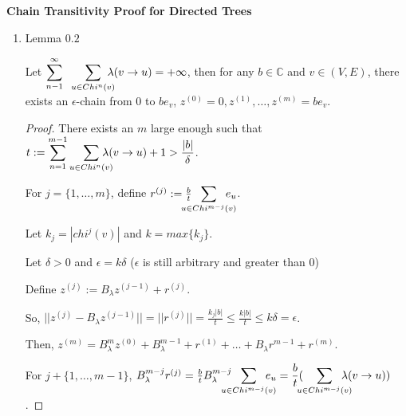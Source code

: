 \documentclass{article}
\begin{document}
\begin{center}
{\bf 
Chain Transitivity Proof for Directed Trees\\

}
\end{center}
\medbreak\medbreak


\begin{enumerate}

\item Lemma $0.2$

Let $\displaystyle\sum^{\infty}_{n-1}
\hspace{0.2cm}\sum_{u\in Chi^n(v)}\hspace{-0.3cm}\lambda(v \rightarrow u) = +\infty$, then for any $b\in \mathbb{C}$ and $v\in (V,E)$, there exists an $\epsilon$-chain from $0$ to $be_v$, $z^{(0)}=0,z^{(1)},\dots,z^{(m)}=be_v$.

\begin{proof}
    There exists an $m$ large enough such that $t:=\displaystyle\sum^{m-1}_{n=1} \sum_{u\in Chi^n(v)}\hspace{-0.4cm} \lambda(v\rightarrow u) + 1 > \frac{|b|}{\delta}$.

    For $j=\{1,\dots,m\}$, define $r^{(j)}:=\frac{b}{t}\hspace{-0.4cm}\displaystyle\sum_{u\in Chi^{m-j}(v)}\hspace{-0.4cm}e_u$.
    
    Let $k_j=|chi^j(v)|$ and $k=max\{k_j\}$.

    Let $\delta>0$ and $\epsilon=k\delta$ ($\epsilon$ is still arbitrary and greater than $0$)


    Define $z^{(j)}:= B_\lambda z^{(j-1)} +r^{(j)}$.

    So, $||z^{(j)}-B_\lambda z^{(j-1)}||=||r^{(j)}||=\frac{k_j|b|}{t} \leq \frac{k|b|}{t}\leq k\delta=\epsilon$.

    Then, $z^{(m)}=B_\lambda^m z^{(0)}+B_\lambda^{m-1}+r^{(1)}+\dots+B_\lambda r^{m-1}+r^{(m)}$.

    For $j+\{1,\dots,m-1\}$, $B_\lambda^{m-j}r^{(j)}=\frac{b}{t}B_\lambda^{m-j}\hspace{-0.4cm}\displaystyle\sum_{u\in Chi^{m-j}(v)}\hspace{-0.4cm}e_u = \frac{b}{t}(\hspace{-0.2cm}\displaystyle\sum_{u\in Chi^{m-j}(v)} \hspace{-0.4cm}\lambda(v\rightarrow u))$.


\end{proof}
\end{enumerate}
\end{document}

